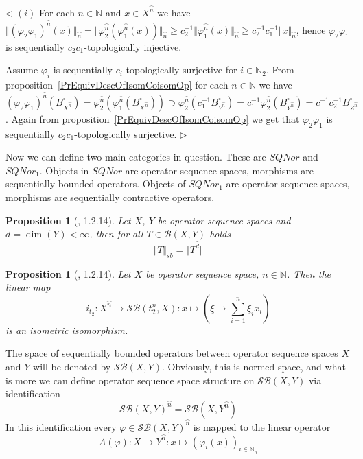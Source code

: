 \documentclass[12pt]{article}
\newtheorem{proposition}[theorem]{Proposition}
\newenvironment{proof}{\par $\triangleleft$}{$\triangleright$}
\begin{document}
\begin{proof}
$(i)$ For each $n\in\mathbb{N}$ and $x\in X^{\wideparen{n}}$ we have 
$\Vert{(\varphi_2\varphi_1)}^{\wideparen{n}}(x)\Vert_{\wideparen{n}}
=\Vert
    \varphi_2^{\wideparen{n}}(\varphi_1^{\wideparen{n}}(x))
\Vert_{\wideparen{n}}
\geq c_2^{-1}\Vert\varphi_1^{\wideparen{n}}(x)\Vert_{\wideparen{n}}
\geq c_2^{-1}c_1^{-1}\Vert x\Vert_{\wideparen{n}}$, hence 
$\varphi_2\varphi_1$ is sequentially $c_2c_1$-topologically injective.

 Assume $\varphi_i$ is sequentially $c_i$-topologically surjective for 
$i\in\mathbb{N}_2$. From proposition~\ref{PrEquivDescOfIsomCoisomOp} for each 
$n\in\mathbb{N}$ we have 
${(\varphi_2\varphi_1)}^{\wideparen{n}}(B_{X^{\wideparen{n}}}^\circ)
=\varphi_2^{\wideparen{n}}(\varphi_1^{\wideparen{n}}(
    B_{X^{\wideparen{n}}}^\circ
))
\supset\varphi_2^{\wideparen{n}}(c_1^{-1}B_{Y^{\wideparen{n}}}^\circ)
=c_1^{-1}\varphi_2^{\wideparen{n}}(B_{Y^{\wideparen{n}}}^\circ)
=c^{-1}c_2^{-1}B_{Z^{\wideparen{n}}}^\circ$. 
Again from proposition~\ref{PrEquivDescOfIsomCoisomOp} 
we get that $\varphi_2\varphi_1$ is sequentially 
$c_2c_1$-topologically surjective.
\end{proof}


Now we can define two main categories in question. These are $SQNor$ and 
$SQNor_1$. Objects in $SQNor$ are operator sequence spaces, morphisms are 
sequentially bounded operators. Objects of $SQNor_1$ are operator sequence 
spaces, morphisms are sequentially contractive operators. 

\begin{proposition}[\cite{LamOpFolgen}, 1.2.14]\label{PrSmithsLemma}
Let $X$, $Y$ be operator sequence spaces and $d=\dim(Y)<\infty$, 
then for all $T\in\mathcal{B}(X,Y)$ holds
$$
\Vert T\Vert_{sb}=\Vert T^{\wideparen{d}}\Vert
$$
\end{proposition}

\begin{proposition}[\cite{LamOpFolgen}, 1.2.14]\label{PrSQSpaceIsSBFromT2n}
Let $X$ be operator sequence space, $n\in\mathbb{N}$. Then the linear map 
$$
i_{t_2}:X^{\wideparen{n}}\to\mathcal{SB}(t^n_2,X)
:x\mapsto\left(\xi\mapsto\sum\limits_{i=1}^n\xi_i x_i\right)
$$
is an isometric isomorphism.
\end{proposition}

The space of sequentially bounded operators between operator sequence 
spaces $X$ and $Y$ will be denoted by $\mathcal{SB}(X, Y)$. Obviously, 
this is normed space, and what is more we can define operator sequence space 
structure on $\mathcal{SB}(X, Y)$ via identification
$$
{\mathcal{SB}(X, Y)}^{\wideparen{n}} = \mathcal{SB}(X, Y^{\wideparen{n}})
$$
In this identification every $\varphi\in{\mathcal{SB}(X,Y)}^{\wideparen{n}}$ is 
mapped to the linear operator
$$
A(\varphi):X\to Y^{\wideparen{n}}:x\mapsto{(\varphi_i(x))}_{i\in\mathbb{N}_n}
$$
\end{document}
